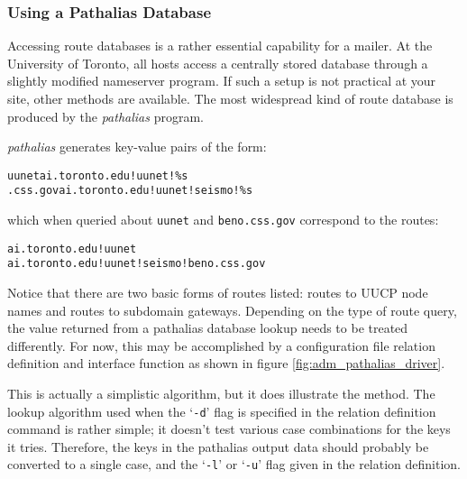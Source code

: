 \subsubsection{Using a Pathalias Database}

Accessing route databases is a rather essential capability for a mailer.
At the University of Toronto, all hosts access a centrally stored database
through a slightly modified nameserver program.
If such a setup is not practical at your site, other methods are available.
The most widespread kind of route database is produced by the {\em pathalias}
program.

{\em pathalias} generates key-value pairs of the form:
\begin{alltt}\small\medskip
  uunet    ai.toronto.edu!uunet!\%s
  .css.gov ai.toronto.edu!uunet!seismo!\%s
\medskip\end{alltt}
which when queried about {\tt uunet} and {\tt beno.css.gov} correspond to 
the routes:
\begin{alltt}\small\medskip
  ai.toronto.edu!uunet
  ai.toronto.edu!uunet!seismo!beno.css.gov
\medskip\end{alltt}

Notice that there are two basic forms of routes listed: routes to UUCP node
names and routes to subdomain gateways.  Depending on the type of route
query, the value returned from a pathalias database lookup needs to be
treated differently.
For now, this may be accomplished by a configuration
file relation definition and interface function as shown in figure
\vref{fig:adm_pathalias_driver}.


This is actually a simplistic algorithm, but it does illustrate the method.
The lookup algorithm used when the `{\tt -d}' flag is specified in the
relation definition command is rather simple; it doesn't test various case
combinations for the keys it tries.  Therefore, the keys in the pathalias
output data should probably be converted to a single case, and the `{\tt -l}'
or `{\tt -u}' flag given in the relation definition.




